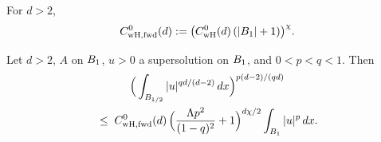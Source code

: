 \begin{definition}
\label{def:C_weakHarnack0Forward}
\leanok
{}
For $d>2$,
\begin{equation*}
  C_{\mathrm{wH,fwd}}^{0}(d) :=
  \big(C_{\mathrm{wH}}^{0}(d)\,(|B_{1}|+1)\big)^{\chi}.
\end{equation*}
\end{definition}

\begin{theorem}
\label{thm:wH-stage1-fwd}
\leanok
{}
Let $d>2$, $A$ on $B_{1}$, $u>0$ a supersolution on $B_{1}$, and
$0 < p < q < 1$. Then
\begin{multline*}
  \Big(\int_{B_{1/2}} |u|^{q d/(d-2)}\,dx\Big)^{p(d-2)/(qd)}
  \\
  \;\leq\;
  C_{\mathrm{wH,fwd}}^{0}(d)\,
  \Big(\frac{\Lambda p^{2}}{(1-q)^{2}}+1\Big)^{d\chi/2}
  \int_{B_{1}} |u|^{p}\,dx.
\end{multline*}
\end{theorem}

